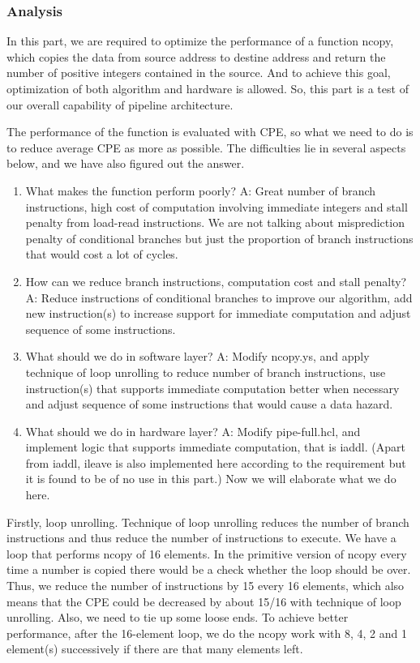 \documentclass{article}
\begin{document}
\subsubsection{Analysis}

   \par In this part, we are required to optimize the performance of a function ncopy, which copies the data from source address to destine address and return the number of positive integers contained in the source. And to achieve this goal, optimization of both algorithm and hardware is allowed. So, this part is a test of our overall capability of pipeline architecture.
    \par  The performance of the function is evaluated with CPE, so what we need to do is to reduce average CPE as more as possible. The difficulties lie in several aspects below, and we have also figured out the answer.
\begin{enumerate}
    \item
	What makes the function perform poorly? A: Great number of branch instructions, high cost of computation involving immediate integers and stall penalty from load-read instructions. We are not talking about misprediction penalty of conditional branches but just the proportion of branch instructions that would cost a lot of cycles.
    \item
	How can we reduce branch instructions, computation cost and stall penalty? A: Reduce instructions of conditional branches to improve our algorithm, add new instruction(s) to increase support for immediate computation and adjust sequence of some instructions.
    \item
	What should we do in software layer? A: Modify ncopy.ys, and apply technique of loop unrolling to reduce number of branch instructions, use instruction(s) that supports immediate computation better when necessary and adjust sequence of some instructions that would cause a data hazard.
    \item
	What should we do in hardware layer? A: Modify pipe-full.hcl, and implement logic that supports immediate computation, that is iaddl. (Apart from iaddl, ileave is also implemented here according to the requirement but it is found to be of no use in this part.)
Now we will elaborate what we do here.
\end{enumerate}
	   \par Firstly, loop unrolling. Technique of loop unrolling reduces the number of branch instructions and thus reduce the number of instructions to execute. We have a loop that performs ncopy of 16 elements. In the primitive version of ncopy every time a number is copied there would be a check whether the loop should be over. Thus, we reduce the number of instructions by 15 every 16 elements, which also means that the CPE could be decreased by about 15/16 with technique of loop unrolling. Also, we need to tie up some loose ends. To achieve better performance, after the 16-element loop, we do the ncopy work with 8, 4, 2 and 1 element(s) successively if there are that many elements left.
\end{document}
